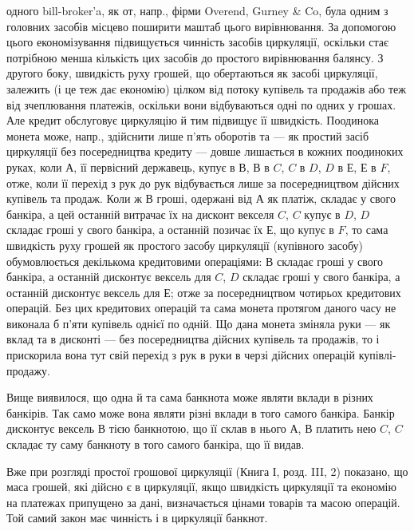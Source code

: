\parcont{}  %
одного bill-broker’a, як от, напр., фірми Overend, Gurney \& Co, була одним з головних
засобів місцево поширити маштаб цього вирівнювання. За допомогою
цього економізування підвищується чинність засобів циркуляції, оскільки стає
потрібною менша кількість цих засобів до простого вирівнювання балянсу.
З другого боку, швидкість руху грошей, що обертаються як засобі циркуляції, залежить
(і це теж дає економію) цілком від потоку купівель та продажів або теж
від зчеплювання платежів, оскільки вони відбуваються одні по одних у грошах.
Але кредит обслуговує циркуляцію й тим підвищує її швидкість. Поодинока монета
може, напр., здійснити лише п’ять оборотів та — як простий засіб циркуляції
без посередництва кредиту — довше лишається в кожних поодиноких руках,
коли $А$, її первісний державець, купує в $В$, $В$ в $C$, $C$ в $D$, $D$ в $Е$, $Е$ в $F$, отже,
коли її перехід з рук до рук відбувається лише за посередництвом дійсних купівель
та продаж. Коли ж $В$ гроші, одержані від $А$ як платіж, складає у свого
банкіра, а цей останній витрачає їх на дисконт векселя $C$, $C$ купує в $D$, $D$ складає
гроші у свого банкіра, а останній позичає їх $Е$, що купує в $F$, то сама
швидкість руху грошей як простого засобу циркуляції (купівного засобу) обумовлюється декількома
кредитовими операціями: $В$ складає гроші у свого банкіра,
а останній дисконтує вексель для $C$, $D$ складає гроші у свого банкіра, а останній
дисконтує вексель для $Е$; отже за посередництвом чотирьох кредитових операцій.
Без цих кредитових операцій та сама монета протягом даного часу не виконала
б п’яти купівель однієї по одній. Що дана монета зміняла руки — як вклад та
в дисконті — без посередництва дійсних купівель та продажів, то і прискорила
вона тут свій перехід з рук в руки в черзі дійсних операцій купівлі-продажу.

Вище виявилося, що одна й та сама банкнота може являти вклади в
різних банкірів. Так само може вона являти різні вклади в того самого банкіра.
Банкір дисконтує вексель $В$ тією банкнотою, що її склав в нього $А$, $В$ платить
нею $C$, $C$ складає ту саму банкноту в того самого банкіра, що її видав.

Вже при розгляді простої грошової циркуляції (Книга І, розд. III, 2) показано,
що маса грошей, які дійсно є в циркуляції, якщо швидкість циркуляції
та економію на платежах припущено за дані, визначається цінами товарів та
масою операцій. Той самий закон має чинність і в циркуляції банкнот.

